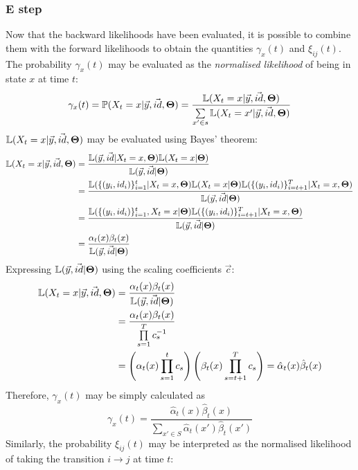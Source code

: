 \documentclass[12pt,a4paper,twoside,openright]{report}
\begin{document}
\subsubsection{E step}

Now that the backward likelihoods have been evaluated, it is possible to combine them with the forward likelihoods to obtain the quantities $\gamma_x(t)$ and $\xi_{ij}(t)$. The probability $\gamma_x(t)$ may be evaluated as the \emph{normalised likelihood} of being in state $x$ at time $t$:
\[
\gamma_x(t) = \mathbb{P}(X_t = x | \vec{y}, \vec{id}, {\bf\Theta}) = \frac{\mathbb{L}(X_t = x | \vec{y}, \vec{id}, {\bf\Theta})}{\sum\limits_{x'\in s}{\mathbb{L}(X_t = x' | \vec{y}, \vec{id}, {\bf\Theta})}}
\]
$\mathbb{L}(X_t = x | \vec{y}, \vec{id}, {\bf\Theta})$ may be evaluated using Bayes' theorem:
\[\begin{aligned}
\mathbb{L}(X_t = x | \vec{y}, \vec{id}, {\bf\Theta}) &= \frac{\mathbb{L}(\vec{y}, \vec{id} | X_t = x, {\bf\Theta})\mathbb{L}(X_t = x|{\bf\Theta})}{\mathbb{L}(\vec{y}, \vec{id}|{\bf\Theta})}\\
&= \frac{\mathbb{L}(\{(y_i, id_i)\}_{i=1}^{t} | X_t = x, {\bf\Theta})\mathbb{L}(X_t = x|{\bf\Theta})\mathbb{L}(\{(y_i, id_i)\}_{i=t+1}^{T} | X_t = x, {\bf\Theta})}{\mathbb{L}(\vec{y}, \vec{id}|{\bf\Theta})}\\
&= \frac{\mathbb{L}(\{(y_i, id_i)\}_{i=1}^{t}, X_t = x | {\bf\Theta})\mathbb{L}(\{(y_i, id_i)\}_{i=t+1}^{T} | X_t = x, {\bf\Theta})}{\mathbb{L}(\vec{y}, \vec{id}|{\bf\Theta})}\\
&= \frac{\alpha_t(x)\beta_t(x)}{\mathbb{L}(\vec{y}, \vec{id}|{\bf\Theta})}\\
\end{aligned}\]
Expressing $\mathbb{L}(\vec{y}, \vec{id}|{\bf\Theta})$ using the scaling coefficients $\vec{c}$:
\[\begin{aligned}
\mathbb{L}(X_t = x | \vec{y}, \vec{id}, {\bf\Theta}) &= \frac{\alpha_t(x)\beta_t(x)}{\mathbb{L}(\vec{y}, \vec{id}|{\bf\Theta})}\\
&= \frac{\alpha_t(x)\beta_t(x)}{\prod\limits_{s=1}^{T}{c_s^{-1}}}\\
&= \left(\alpha_t(x)\prod_{s=1}^{t}{c_s}\right)\left(\beta_t(x)\prod_{s=t+1}^{T}{c_s}\right) = \hat{\alpha}_t(x)\hat{\beta}_t(x)
\end{aligned}\]
Therefore, $\gamma_x(t)$ may be simply calculated as
\[\gamma_x(t)=\frac{\hat{\alpha}_t(x)\hat{\beta}_t(x)}{\sum\limits_{x'\in S}{\hat{\alpha}_t(x')\hat{\beta}_t(x')}}\]
Similarly, the probability $\xi_{ij}(t)$ may be interpreted as the normalised likelihood of taking the transition $i\longrightarrow j$ at time $t$:
\end{document}
